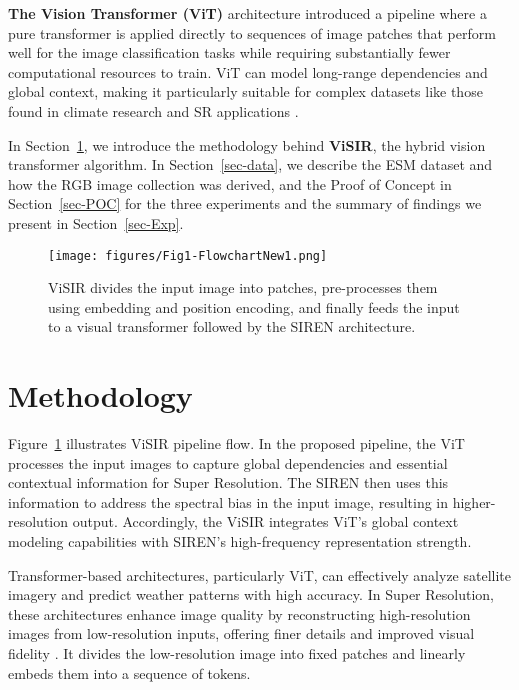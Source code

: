\documentclass[pdflatex,sn-mathphys-num]{sn-jnl}%
\begin{document}
\noindent \textbf{The Vision Transformer (ViT)} architecture introduced a pipeline where a pure transformer is applied directly to sequences of image patches that perform well for the image classification tasks while requiring substantially fewer computational resources to train\cite{Dosovitskiy2020}. ViT can model long-range dependencies and global context, making it particularly suitable for complex datasets like those found in climate research and SR applications \cite{Dosovitskiy2020}.



In Section~\ref{sec-method}, we introduce the methodology behind \textbf{ViSIR}, the hybrid vision transformer algorithm. In Section~\ref{sec-data}, we describe the ESM dataset and how the RGB image collection was derived, and the Proof of Concept in Section~\ref{sec-POC} for the three experiments and the summary of findings we present in Section~\ref{sec-Exp}.

\begin{figure}[!ht]
 \centering
 \texttt{[image: figures/Fig1-FlowchartNew1.png]} 
 \vspace*{-2em}
 \caption{ViSIR divides the input image into patches, pre-processes them using embedding and position encoding, and finally feeds the input to a visual transformer followed by the SIREN architecture.}
 \label{fig-Flowchart}
 \vspace*{-1em}
\end{figure}

\section{Methodology}
\label{sec-method}

Figure~\ref{fig-Flowchart} illustrates ViSIR pipeline flow. In the proposed pipeline, the ViT processes the input images to capture global dependencies and essential contextual information for Super Resolution. The SIREN then uses this information to address the spectral bias in the input image, resulting in higher-resolution output. Accordingly, the ViSIR integrates ViT's global context modeling capabilities with SIREN's high-frequency representation strength. 


Transformer-based architectures, particularly ViT, can effectively analyze satellite imagery and predict weather patterns with high accuracy\cite{garnot2021}. In Super Resolution, these architectures enhance image quality by reconstructing high-resolution images from low-resolution inputs, offering finer details and improved visual fidelity \cite{yang2020l}. It divides the low-resolution image into fixed patches and linearly embeds them into a sequence of tokens. 
\end{document}
